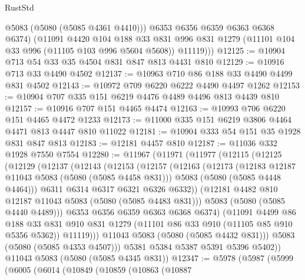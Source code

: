 \begin{lexlean}{RustStd}
\begin{coremodule}
            @5083
            (@5080 (@5085 @4361 @4410)))
          @6353
          @6356
          @6359
          @6363
          @6368
          @6374)
        (@11091
          @4420
          @104
          @188
          @33
          @831
          @996
          @831
          @1279
          (@11101 @104 @33 @996 (@11105 @103 @996 @5604 @5608))
          @11119)))
@12125 := @10904 @713 @54 @33 @35 @4504 @831 @847 @813 @4431 @810
@12129 := @10916 @713 @33 @4490 @4502
@12137 := @10963 @710 @86 @188 @33 @4490 @4499 @831 @4502
@12143 := @10972 @709 @6220 @6222 @4490 @4497 @1262
@12153 := @10904 @707 @335 @151 @6219 @4476 @4489 @4496 @813 @4439 @810
@12157 := @10916 @707 @151 @4465 @4474
@12163 := @10993 @706 @6220 @151 @4465 @4472 @1233
@12173 := @11000 @335 @151 @6219 @3806 @4464 @4471 @813 @4447 @810 @11022
@12181 := @10904 @333 @54 @151 @35 @1928 @831 @847 @813
@12183 := @12181 @4457 @810
@12187 := @11036 @332 @1928 @7550 @7554
@12280 := @11967
    (@11971
      (@11977
        (@12115
          (@12125
            (@12129
              (@12137
                (@12143
                  (@12153
                    (@12157
                      (@12163
                        (@12173
                          (@12183 @12187 @11043 @5083 (@5080 (@5085 @4458 @831)))
                          @5083
                          (@5080 (@5085 @4448 @4464)))
                        @6311
                        @6314
                        @6317
                        @6321
                        @6326
                        @6332))
                    (@12181 @4482 @810 @12187 @11043 @5083 (@5080 (@5085 @4483 @831)))
                    @5083
                    (@5080 (@5085 @4440 @4489)))
                  @6353
                  @6356
                  @6359
                  @6363
                  @6368
                  @6374)
                (@11091
                  @4499
                  @86
                  @188
                  @33
                  @831
                  @910
                  @831
                  @1279
                  (@11101 @86 @33 @910 (@11105 @85 @910 @5356 @5362))
                  @11119)))
            @11043
            @5083
            (@5080 (@5085 @4432 @831)))
          @5083
          (@5080 (@5085 @4353 @4507)))
        @5381
        @5384
        @5387
        @5391
        @5396
        @5402))
    @11043
    @5083
    (@5080 (@5085 @4345 @831))
@12347 := @5978
    (@5987
      (@5999
        (@6005
          (@6014
            (@10849
              (@10859
                (@10863
                  (@10887

\end{coremodule}
\end{lexlean}
